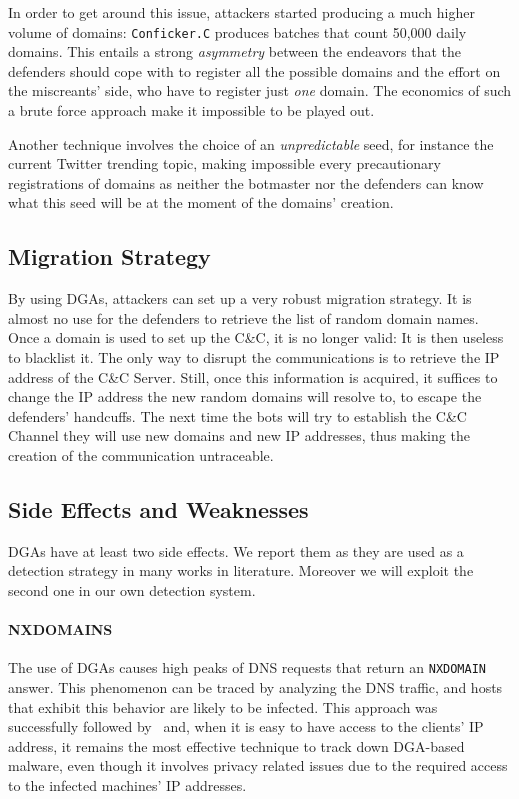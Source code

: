 In order to get around this issue, attackers started producing a much higher
volume of domains: \texttt{Conficker.C} produces batches that count 50,000
daily domains. This entails a strong \emph{asymmetry} between the endeavors that
the defenders should cope with to register all the possible domains and the
effort on the miscreants' side, who have to register just \emph{one} domain.
The economics of such a brute force approach make it impossible to be played out.

Another technique involves the choice of an \emph{unpredictable} seed, for instance
the current Twitter trending topic, making impossible every precautionary registrations
of domains as neither the botmaster nor the defenders can know what this seed will
be at the moment of the domains' creation.

\subsection{Migration Strategy} %
\label{sub:migration_strategy}
By using DGAs, attackers can set up a very robust migration strategy. It is almost
no use for the defenders to retrieve the list of random domain names. Once a domain
is used to set up the C\&C, it is no longer valid: It is then useless to blacklist it.
The only way to disrupt the communications is to retrieve the IP address of the
C\&C Server. Still, once this information is acquired, it suffices to change the IP
address the new random domains will resolve to, to escape the defenders' handcuffs.
The next time the bots will try to establish the C\&C Channel they will use new domains
and new IP addresses, thus making the creation of the communication untraceable.


\subsection{Side Effects and Weaknesses} %
\label{sub:side_effects}
DGAs have at least two side effects.
We report them as they are used as a detection strategy in many works in literature.
Moreover we will exploit the second one in our own detection system.

\paragraph{NXDOMAINS} The use of DGAs causes high peaks of DNS requests that return
an \texttt{NXDOMAIN} answer. This phenomenon can be traced by analyzing the DNS traffic, and
hosts that exhibit this behavior are likely to be infected. This approach was successfully
followed by~\citet{antonakakis2012} and, when it is easy to have access to the
clients' IP address, it remains the most effective technique to track down DGA-based malware, even though it involves privacy related issues due to the required access
to the infected machines' IP addresses.

